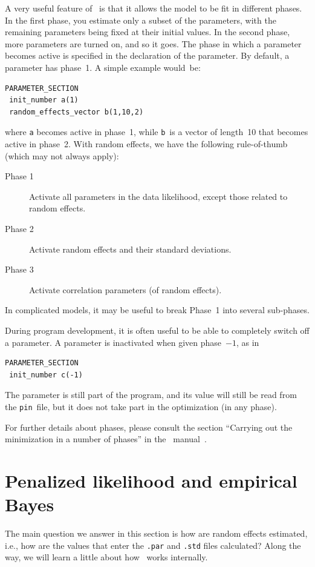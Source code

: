 \documentclass{admbmanual}
\begin{document}
A very useful feature of \scAB\ is that it allows the model to be fit in different phases. In the
first phase, you estimate only a subset of the parameters, with the remaining parameters being fixed at their
initial values. In the second phase, more parameters are turned on, and so it goes. The phase in which a parameter
becomes active is specified in the declaration of the parameter. By default, a parameter has phase~1. A simple
example would~be:
\begin{lstlisting}
PARAMETER_SECTION
 init_number a(1)
 random_effects_vector b(1,10,2)
\end{lstlisting}
where \texttt{a} becomes active in phase~1, while \texttt{b}\ is a vector of length~10 that becomes active in phase~2. 
With random effects, we have the following rule-of-thumb (which may not always apply):
\begin{description}
\item[Phase 1] Activate all parameters in the data likelihood, except those related to random effects.
\item[Phase 2] Activate random effects and their standard deviations.
\item[Phase 3] Activate correlation parameters (of random effects).
\end{description}
In complicated models, it may be useful to break Phase~1 into several sub-phases. 

During program development, it is often useful to be able to completely switch off a parameter. A parameter
is inactivated when given phase~$-1$, as in
\begin{lstlisting}
PARAMETER_SECTION
 init_number c(-1)
\end{lstlisting}
The parameter is still part of the program, and
its value will still be read from the \texttt{pin}~file, but it does not take part in the optimization (in any phase).

For further details about phases, please consult the section
``Carrying out the minimization in a number of phases'' in the \scAB\ manual~\cite{admb_manual}.


\section{Penalized likelihood and empirical Bayes}
\label{sec:hood}

The main question we answer in this section is how are random effects estimated, i.e., how
are the values that enter the \texttt{.par} and  \texttt{.std} files calculated? Along the way,
we will learn a little about how \scAR\ works internally.
\end{document}

